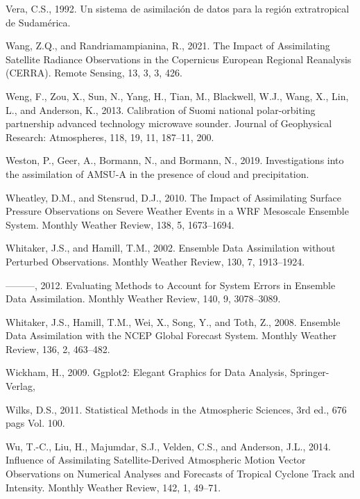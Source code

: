 \documentclass[12pt,oneside,a4paper]{reedthesis}
\begin{document}
\leavevmode\hypertarget{ref-vera1992}{}%
Vera, C.S., 1992. Un sistema de asimilación de datos para la región extratropical de Sudamérica.

\leavevmode\hypertarget{ref-wang2021}{}%
Wang, Z.Q., and Randriamampianina, R., 2021. The Impact of Assimilating Satellite Radiance Observations in the Copernicus European Regional Reanalysis (CERRA). Remote Sensing, 13, 3, 3, 426.

\leavevmode\hypertarget{ref-weng2013}{}%
Weng, F., Zou, X., Sun, N., Yang, H., Tian, M., Blackwell, W.J., Wang, X., Lin, L., and Anderson, K., 2013. Calibration of Suomi national polar-orbiting partnership advanced technology microwave sounder. Journal of Geophysical Research: Atmospheres, 118, 19, 11, 187--11, 200.

\leavevmode\hypertarget{ref-weston2019}{}%
Weston, P., Geer, A., Bormann, N., and Bormann, N., 2019. Investigations into the assimilation of AMSU-A in the presence of cloud and precipitation.

\leavevmode\hypertarget{ref-wheatley2010}{}%
Wheatley, D.M., and Stensrud, D.J., 2010. The Impact of Assimilating Surface Pressure Observations on Severe Weather Events in a WRF Mesoscale Ensemble System. Monthly Weather Review, 138, 5, 1673--1694.

\leavevmode\hypertarget{ref-whitaker2002}{}%
Whitaker, J.S., and Hamill, T.M., 2002. Ensemble Data Assimilation without Perturbed Observations. Monthly Weather Review, 130, 7, 1913--1924.

\leavevmode\hypertarget{ref-whitaker2012}{}%
---------, 2012. Evaluating Methods to Account for System Errors in Ensemble Data Assimilation. Monthly Weather Review, 140, 9, 3078--3089.

\leavevmode\hypertarget{ref-whitaker2008}{}%
Whitaker, J.S., Hamill, T.M., Wei, X., Song, Y., and Toth, Z., 2008. Ensemble Data Assimilation with the NCEP Global Forecast System. Monthly Weather Review, 136, 2, 463--482.

\leavevmode\hypertarget{ref-wickham2009}{}%
Wickham, H., 2009. Ggplot2: Elegant Graphics for Data Analysis, Springer-Verlag,

\leavevmode\hypertarget{ref-wilks2011}{}%
Wilks, D.S., 2011. Statistical Methods in the Atmospheric Sciences, 3rd ed., 676 pags Vol. 100.

\leavevmode\hypertarget{ref-wu2014}{}%
Wu, T.-C., Liu, H., Majumdar, S.J., Velden, C.S., and Anderson, J.L., 2014. Influence of Assimilating Satellite-Derived Atmospheric Motion Vector Observations on Numerical Analyses and Forecasts of Tropical Cyclone Track and Intensity. Monthly Weather Review, 142, 1, 49--71.
\end{document}
